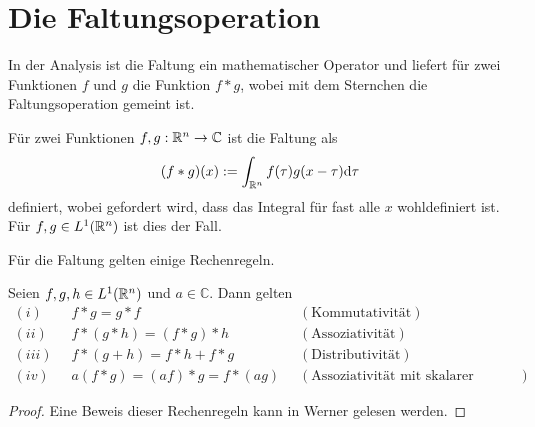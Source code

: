 
\section{Die Faltungsoperation}
\label{abs:conv_theorie}
In der Analysis ist die Faltung ein mathematischer Operator und liefert für zwei Funktionen $f$ und $g$ die Funktion $ f \ast g$, wobei mit dem Sternchen die Faltungsoperation gemeint ist.

\begin{defi}[Faltung]\label{allg_faltung}
    Für zwei Funktionen $f,g: \mathbb{R}^{n} \rightarrow \mathbb{C}$ ist die Faltung als
    \begin{equation*}
        (f \ast g) (x) := \int_{\mathbb{R}^{n}} f(\tau) g(x-\tau) \mathrm{d} \tau
    \end{equation*}
    definiert, wobei gefordert wird, dass das Integral für fast alle $x$ wohldefiniert ist. Für $f,g \in L^1(\mathbb{R}^n)$ ist dies der Fall.
   \end{defi}

Für die Faltung gelten einige Rechenregeln.

\begin{lem}
    \label{lem:convrules}
    Seien $f,g,h \in L^1(\mathbb{R}^n)$ und $a \in \mathbb{C}$. Dann gelten
    \begin{align*}
         (i) \; \; &f \ast g = g \ast f \; \; &( \text{Kommutativität}) \\
         (ii) \; \; &f \ast (g \ast h) = (f \ast g) \ast h  \; \;& (\text{Assoziativität}) \\
         (iii) \; \; &f \ast (g+h) = f \ast h + f\ast g \; \; &(\text{Distributivität}) \\ 
         (iv) \; \; &a(f \ast g) = (af) \ast g = f \ast (ag) \; \; &(\text{Assoziativität mit skalarer Multiplikation}) 
    \end{align*}
\end{lem}

\begin{proof}
    Eine Beweis dieser Rechenregeln kann in Werner\cite{werner2011funktionalanalysis} gelesen werden.
\end{proof}

